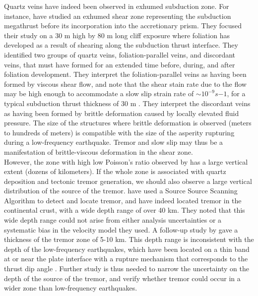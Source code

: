 \documentclass[draft]{agujournal2019}
\begin{document}
Quartz veins have indeed been observed in exhumed subduction zone. For instance,  have studied an exhumed shear zone representing the subduction megathrust before its incorporation into the accretionary prism. They focused their study on a 30 m high by 80 m long cliff exposure where foliation has developed as a result of shearing along the subduction thrust interface. They identified two groups of quartz veins, foliation-parallel veins, and discordant veins, that must have formed for an extended time before, during, and after foliation development. They interpret the foliation-parallel veins as having been formed by viscous shear flow, and note that the shear stain rate due to the flow may be high enough to accommodate a slow slip strain rate of $\sim 10^{-9} s{-1}$, for a typical subduction thrust thickness of 30 m \cite{ROW_2013}. They interpret the discordant veins as having been formed by brittle deformation caused by locally elevated fluid pressure. The size of the structures where brittle deformation is observed (meters to hundreds of meters) is compatible with the size of the asperity rupturing during a low-frequency earthquake. Tremor and slow slip may thus be a manifestation of brittle-viscous deformation in the shear zone. \\

However, the zone with high low Poisson's ratio observed by \cite{HYN_2015} has a large vertical extent (dozens of kilometers). If the whole zone is associated with quartz deposition and tectonic tremor generation, we should also observe a large vertical distribution of the source of the tremor.  have used a Source Source Scanning Algorithm to detect and locate tremor, and have indeed located tremor in the continental crust, with a wide depth range of over 40 km. They noted that this wide depth range could not arise from either analysis uncertainties or a systematic bias in the velocity model they used. A follow-up study by  gave a thickness of the tremor zone of 5-10 km. This depth range is inconsistent with the depth of the low-frequency earthquakes, which have been located on a thin band at or near the plate interface with a rupture mechanism that corresponds to the thrust dip angle \cite{IDE_2007_GRL}. Further study is thus needed to narrow the uncertainty on the depth of the source of the tremor, and verify whether tremor could occur in a wider zone than low-frequency earthquakes. \\
\end{document}
